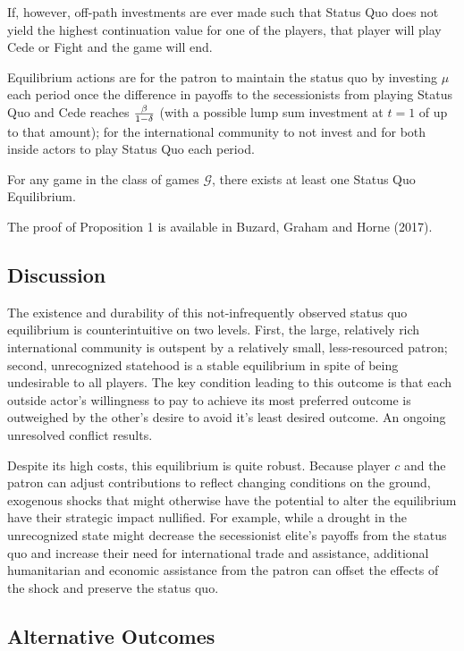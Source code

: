 If, however, off-path investments are ever made such that Status Quo does not yield the highest continuation value for one of the players, that player will play Cede or Fight and the game will end.

Equilibrium actions are for the patron to maintain the status quo by investing $\mu$ each period once the difference in payoffs to the secessionists from playing Status Quo and Cede reaches $\frac{\beta}{1-\delta}$ (with a possible lump sum investment at $t=1$ of up to that amount); for the international community to not invest and for both inside actors to play Status Quo each period.

\begin{proposition}
	For any game in the class of games $\mathcal{G}$, there exists at least one Status Quo Equilibrium.
\end{proposition}

The proof of Proposition 1 is available in Buzard, Graham and Horne (2017).


\subsection{Discussion}

The existence and durability of this not-infrequently observed status quo equilibrium is counterintuitive on two levels. First, the large, relatively rich international community is outspent by a relatively small, less-resourced patron; second, unrecognized statehood is a stable equilibrium in spite of being undesirable to all players. The key condition leading to this outcome is that each outside actor's willingness to pay to achieve its most preferred outcome is outweighed by the other's desire to avoid it's least desired outcome. An ongoing unresolved conflict results.

Despite its high costs, this equilibrium is quite robust. Because player $c$ and the patron can adjust contributions to reflect changing conditions on the ground, exogenous shocks that might otherwise have the potential to alter the equilibrium have their strategic impact nullified. For example, while a drought in the unrecognized state might decrease the secessionist elite's payoffs from the status quo and increase their need for international trade and assistance, additional humanitarian and economic assistance from the patron can offset the effects of the shock and preserve the status quo.

\subsection{Alternative Outcomes}
\label{sec:alt}

